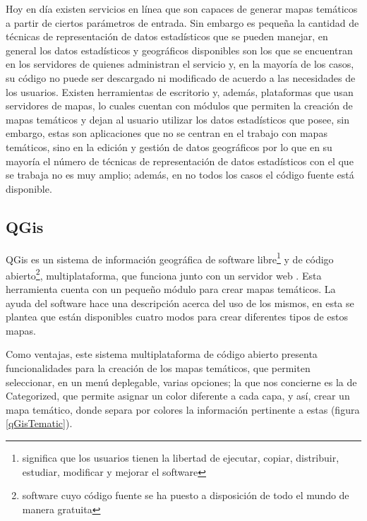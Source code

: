 Hoy en d\'ia existen servicios en l\'inea que son capaces de generar mapas tem\'aticos a partir de ciertos par\'ametros de entrada. Sin embargo es peque\~na la cantidad de t\'ecnicas de representaci\'on de datos estad\'isticos que se pueden manejar, en general los datos estad\'isticos y geogr\'aficos disponibles son los que se encuentran en los servidores de quienes administran el servicio y, en la mayor\'ia de los casos, su c\'odigo no puede ser descargado ni modificado de acuerdo a las necesidades de los usuarios. Existen herramientas de escritorio y, adem\'as, plataformas que usan servidores de mapas, lo cuales cuentan con m\'odulos que permiten la creaci\'on de mapas tem\'aticos y dejan al usuario utilizar los datos estad\'isticos que posee, sin embargo, estas son aplicaciones que no se centran en el trabajo con mapas tem\'aticos, sino en la edici\'on y gesti\'on de datos geogr\'aficos por lo que en su mayor\'ia el n\'umero de t\'ecnicas de representaci\'on de datos estad\'isticos con el que se trabaja no es muy amplio; adem\'as, en no todos los casos el c\'odigo fuente est\'a disponible.


\subsection{QGis}
QGis es un sistema de informaci\'on geogr\'afica de software libre\footnote{significa que los usuarios tienen la libertad de ejecutar, copiar, distribuir, estudiar, modificar y mejorar el software} y de c\'odigo abierto\footnote{software cuyo c\'odigo fuente se ha puesto a disposici\'on de todo el mundo de manera gratuita}, multiplataforma, que funciona junto con un servidor web \cite{ART}. Esta herramienta cuenta con un peque\~no m\'odulo para crear mapas tem\'aticos. La ayuda del software hace una descripci\'on acerca del uso de los mismos, en esta se plantea que est\'an disponibles cuatro modos para crear diferentes tipos de estos mapas.

Como ventajas, este sistema multiplataforma de c\'odigo abierto presenta funcionalidades para la creaci\'on de los mapas tem\'aticos, que permiten seleccionar, en un men\'u deplegable, varias opciones; la que nos concierne es la de Categorized, que permite asignar un color diferente a cada capa, y as\'i, crear un mapa tem\'atico, donde separa por colores la informaci\'on pertinente a estas (figura \ref{qGisTematic}). 

